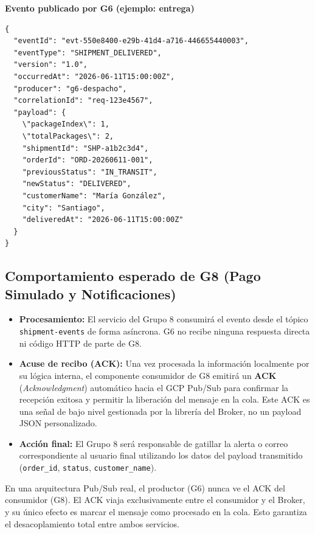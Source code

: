 \documentclass[11pt, a4paper]{article}
\newcommand{\contractheader}[1]{%
  \noindent\colorbox{primary!10}{%
    \parbox{\dimexpr\textwidth-2\fboxsep}{%
      \textbf{\faFileCode\quad #1}%
    }%
  }
  \vspace{0.3cm}
}
\begin{document}
\contractheader{Evento publicado por G6 (ejemplo: entrega)}

\begin{lstlisting}
{
  "eventId": "evt-550e8400-e29b-41d4-a716-446655440003",
  "eventType": "SHIPMENT_DELIVERED",
  "version": "1.0",
  "occurredAt": "2026-06-11T15:00:00Z",
  "producer": "g6-despacho",
  "correlationId": "req-123e4567",
  "payload": {
    \"packageIndex\": 1,
    \"totalPackages\": 2,
    "shipmentId": "SHP-a1b2c3d4",
    "orderId": "ORD-20260611-001",
    "previousStatus": "IN_TRANSIT",
    "newStatus": "DELIVERED",
    "customerName": "María González",
    "city": "Santiago",
    "deliveredAt": "2026-06-11T15:00:00Z"
  }
}
\end{lstlisting}

\subsection{Comportamiento esperado de G8 (Pago Simulado y Notificaciones)}

\begin{itemize}[noitemsep]
  \item \textbf{Procesamiento:} El servicio del Grupo 8 consumirá el evento
    desde el tópico \texttt{shipment-events} de forma asíncrona. G6 no recibe
    ninguna respuesta directa ni código HTTP de parte de G8.
  \item \textbf{Acuse de recibo (ACK):} Una vez procesada la información
    localmente por su lógica interna, el componente consumidor de G8 emitirá un
    \textbf{ACK} (\textit{Acknowledgment}) automático hacia el GCP Pub/Sub para
    confirmar la recepción exitosa y permitir la liberación del mensaje en la
    cola. Este ACK es una señal de bajo nivel gestionada por la librería del
    Broker, no un payload JSON personalizado.
  \item \textbf{Acción final:} El Grupo 8 será responsable de gatillar la
    alerta o correo correspondiente al usuario final utilizando los datos del
    payload transmitido (\texttt{order\_id}, \texttt{status},
    \texttt{customer\_name}).
\end{itemize}

\begin{infobox}
  En una arquitectura Pub/Sub real, el productor (G6) nunca ve el ACK del
  consumidor (G8). El ACK viaja exclusivamente entre el consumidor y el
  Broker, y su único efecto es marcar el mensaje como procesado en la cola.
  Esto garantiza el desacoplamiento total entre ambos servicios.
\end{infobox}
\end{document}
